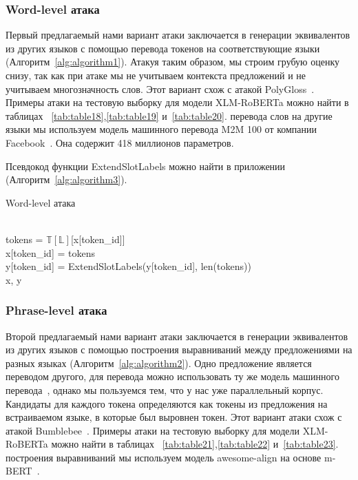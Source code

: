 \subsubsection{Word-level атака}
Первый предлагаемый нами вариант атаки заключается в генерации эквивалентов из других языков с помощью перевода токенов на соответствующие языки (Алгоритм~\eqref{alg:algorithm1}).
Атакуя таким образом, мы строим грубую оценку снизу, так как при атаке мы не учитываем контекста предложений и не учитываем многозначность слов.
Этот вариант схож с атакой PolyGloss~\cite{Tan2021CodeMixingOS}.
Примеры атаки на тестовую выборку для модели XLM-RoBERTa можно найти в таблицах ~\eqref{tab:table18},\eqref{tab:table19} и~\eqref{tab:table20}.
 перевода слов на другие языки мы используем модель машинного перевода M2M 100 от компании Facebook~\cite{Fan2020BeyondEM}.
Она содержит 418 миллионов параметров.
\par Псевдокод функции ExtendSlotLabels можно найти в приложении (Алгоритм~\eqref{alg:algorithm3}).

\begin{algorithm}
    \caption{Word-level атака}
    \begin{algorithmic}
            \ind{}
                    \\
                    \ind\ind tokens = $\mathbb{T}[\mathbb{L}]$[x[token\_id]]\\
                    \ind\ind x[token\_id] = tokens\\
                    \ind\ind y[token\_id] = ExtendSlotLabels(y[token\_id], len(tokens))
            \EndIf \\
            \ind\Return x, y
        \EndFunction
    \end{algorithmic}\label{alg:algorithm1}
\end{algorithm}



\subsubsection{Phrase-level атака}
Второй предлагаемый нами вариант атаки заключается в генерации эквивалентов из других языков с помощью построения выравниваний между предложениями на разных языках (Алгоритм~\eqref{alg:algorithm2}).
Одно предложение является переводом другого, для перевода можно использовать ту же модель машинного перевода~\cite{Fan2020BeyondEM}, однако мы пользуемся тем, что у нас уже параллельный корпус.
Кандидаты для каждого токена определяются как токены из предложения на встраиваемом языке, в которые был выровнен токен.
Этот вариант атаки схож с атакой Bumblebee~\cite{Tan2021CodeMixingOS}.
Примеры атаки на тестовую выборку для модели XLM-RoBERTa можно найти в таблицах ~\eqref{tab:table21},\eqref{tab:table22} и~\eqref{tab:table23}.
 построения выравниваний мы используем модель awesome-align на основе m-BERT~\cite{Dou2021WordAB}.

